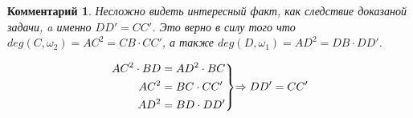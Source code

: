 \documentclass[14pt]{extarticle}
\newtheorem*{corollary}{\textup{Комментарий}}
\newenvironment{rcases}
  {\left.\begin{aligned}}
  {\end{aligned}\right\rbrace}
\begin{document}
\begin{corollary}
	\textup{
	Несложно видеть интересный факт, как следствие доказаной задачи,
	a именно $DD' = CC'$. Это верно в силу того что 
	$deg(C, \omega_2) = AC^2 = CB \cdot CC'$, а также 
    $deg(D, \omega_1) = AD^2 = DB \cdot DD'$. 
    }   


	
\begin{equation*}
\begin{rcases}
	AC^2 \cdot BD &= AD^2 \cdot BC\\
	AC^2 &= BC \cdot CC'\\
    AD^2 &= BD \cdot DD'
\end{rcases} 
\text{$\Rightarrow DD' = CC'$}
\end{equation*} 	
    
\end{corollary}
\end{document}
